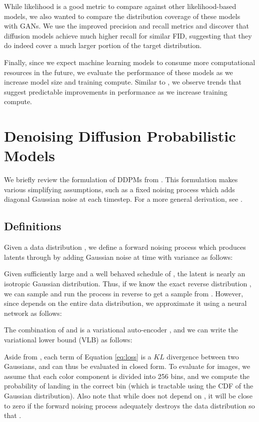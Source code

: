 \documentclass{article}
\begin{document}
While likelihood is a good metric to compare against other likelihood-based models, we also wanted to compare the distribution coverage of these models with GANs. We use the improved precision and recall metrics \citep{improvedpr} and discover that diffusion models achieve much higher recall for similar FID, suggesting that they do indeed cover a much larger portion of the target distribution. 

Finally, since we expect machine learning models to consume more computational resources in the future, we evaluate the performance of these models as we increase model size and training compute. Similar to \cite{scalingcompendium}, we observe trends that suggest predictable improvements in performance as we increase training compute. 

\section{Denoising Diffusion Probabilistic Models}
\label{sec:ddpm}
We briefly review the formulation of DDPMs from \citet{ddpm}. This formulation makes various simplifying assumptions, such as a fixed noising process  which adds diagonal Gaussian noise at each timestep. For a more general derivation, see \citet{diffusion}.

\subsection{Definitions}

Given a data distribution , we define a forward noising process  which produces latents  through  by adding Gaussian noise at time  with variance  as follows:


Given sufficiently large  and a well behaved schedule of , the latent  is nearly an isotropic Gaussian distribution. Thus, if we know the exact reverse distribution , we can sample  and run the process in reverse to get a sample from . However, since  depends on the entire data distribution, we approximate it using a neural network as follows:


The combination of  and  is a variational auto-encoder \citep{vae}, and we can write the variational lower bound (VLB) as follows:


Aside from , each term of Equation \ref{eq:loss} is a \ensuremath{KL} divergence between two Gaussians, and can thus be evaluated in closed form. To evaluate  for images, we assume that each color component is divided into 256 bins, and we compute the probability of  landing in the correct bin (which is tractable using the CDF of the Gaussian distribution). Also note that while  does not depend on , it will be close to zero if the forward noising process adequately destroys the data distribution so that .
\end{document}
